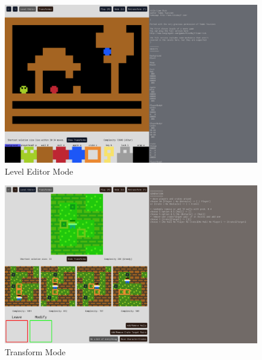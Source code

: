 
\begin{figure}
\centering
\includegraphics[width=1.0\linewidth]{figures/leveleditormode.png}
\caption[LevelEditor]{Level Editor Mode\label{fig:leveleditormode}}
\end{figure}


\begin{figure}
\centering
\includegraphics[width=1.0\linewidth]{figures/imageoftransformmode.png}
\caption[Transformer]{Transform Mode\label{fig:transformermode}}
\end{figure}


